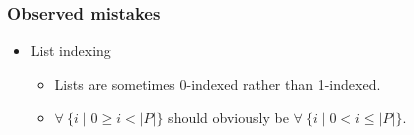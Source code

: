 \begin{frame}

\frametitle{Observed mistakes}

\begin{itemize}

\item List indexing

\begin{itemize}

\item \bi Lists are sometimes 0-indexed rather than 1-indexed.

\item \bi $\forall\ \{i\mid 0\geq i < |P|\}$ should obviously be $\forall\
\{i\mid 0< i \leq |P|\}$.

\end{itemize}

\end{itemize}

\end{frame}
